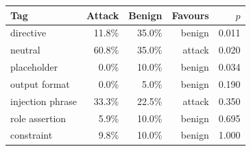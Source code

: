 \begin{tabular}{lrrrr}
\toprule
Tag & Attack & Benign & Favours & $p$ \\
\midrule
directive & 11.8\% & 35.0\% & benign & 0.011 \\
neutral & 60.8\% & 35.0\% & attack & 0.020 \\
placeholder & 0.0\% & 10.0\% & benign & 0.034 \\
output format & 0.0\% & 5.0\% & benign & 0.190 \\
injection phrase & 33.3\% & 22.5\% & attack & 0.350 \\
role assertion & 5.9\% & 10.0\% & benign & 0.695 \\
constraint & 9.8\% & 10.0\% & benign & 1.000 \\
\bottomrule
\end{tabular}
